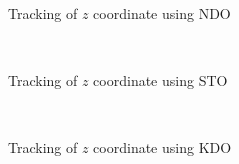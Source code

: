 \documentclass[letterpaper%
, twoside%
, 12pt%
,memoire%
, english%
,creativecommons,hyperref%
]{thETS}
\begin{document}
\begin{figure}[H]
\centering
{}
\\ \parbox{0.75\textwidth}{\caption{Tracking of $z$ coordinate using NDO}
\label{z_trac_dis_m1_ndo}}
\end{figure}

\begin{figure}[H]
\centering
{}
\\ \parbox{0.75\textwidth}{\caption{Tracking of $z$ coordinate using STO}
\label{z_trac_dis_m1_sto}}
\end{figure}

\begin{figure}[H]
\centering
{}
\\ \parbox{0.75\textwidth}{\caption{Tracking of $z$ coordinate using KDO}
\label{z_trac_dis_m1_kdo}}
\end{figure}
\end{document}

